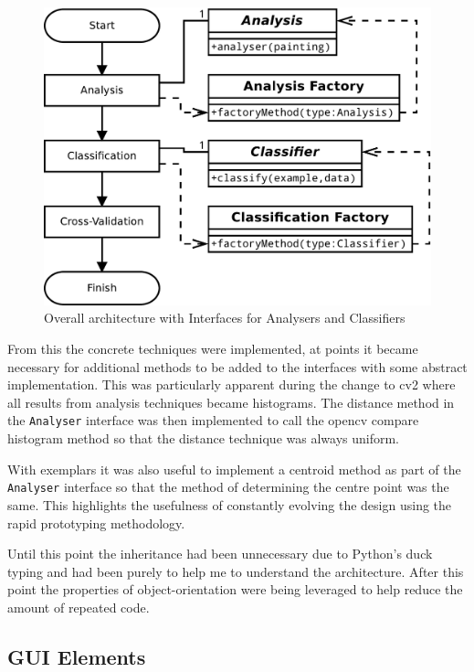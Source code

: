 \begin{figure}[h]
\centering
\includegraphics[scale=0.4]{img/interfaces-arch}
\caption{Overall architecture with Interfaces for Analysers and Classifiers}\label{fig:interfaces-arch}
\end{figure}

From this the concrete techniques were implemented, at points it became necessary for additional 
methods to be added to the interfaces with some abstract implementation. This was particularly
apparent during the change to \gls{cv2} where all results from analysis techniques became 
histograms. The distance method in the \texttt{Analyser} interface was then implemented to call
the \gls{opencv} compare histogram method so that the distance technique was always uniform.

With exemplars it was also useful to implement a centroid method as part of the \texttt{Analyser}
interface so that the method of determining the centre point was the same. This highlights the 
usefulness of constantly evolving the design using the rapid prototyping methodology.

Until this point the inheritance had been unnecessary due to Python's duck typing and had been
purely to help me to understand the architecture. After this point the properties of 
object-orientation were being leveraged to help reduce the amount of repeated code.

\subsection{GUI Elements}

